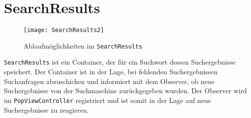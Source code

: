
\section{SearchResults}

\begin{figure}[htb]
  \centering
  \texttt{[image: SearchResults2]}
  \caption{Ablaufmöglichkeiten im \lstinline|SearchResults|}
\end{figure}

\lstinline|SearchResults| ist ein Container, der für ein Suchwort dessen Suchergebnisse speichert.
Der Container ist in der Lage, bei fehlenden Suchergebnissen Suchanfragen abzuschicken und informiert mit dem Observer, ob neue Suchergebnisse von der Suchmaschine zurückgegeben wurden. Der Observer wird im \lstinline|PopViewController| registriert und ist somit in der Lage auf neue Suchergebnisse zu reagieren.